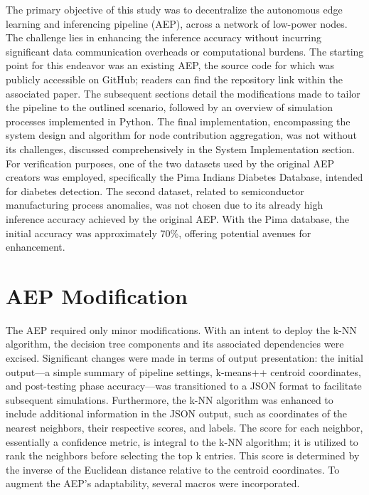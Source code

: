 \label{cha:distributed_aep}
The primary objective of this study was to decentralize the autonomous edge learning and inferencing pipeline (AEP), across a network of low-power nodes. The challenge lies in enhancing the inference accuracy without incurring significant data communication overheads or computational burdens. The starting point for this endeavor was an existing AEP, the source code for which was publicly accessible on GitHub; readers can find the repository link within the associated paper. The subsequent sections detail the modifications made to tailor the pipeline to the outlined scenario, followed by an overview of simulation processes implemented in Python. The final implementation, encompassing the system design and algorithm for node contribution aggregation, was not without its challenges, discussed comprehensively in the System Implementation section. For verification purposes, one of the two datasets used by the original AEP creators was employed, specifically the Pima Indians Diabetes Database\cite{diabetes_db}, intended for diabetes detection. The second dataset, related to semiconductor manufacturing process anomalies, was not chosen due to its already high inference accuracy achieved by the original AEP. With the Pima database, the initial accuracy was approximately 70\%, offering potential avenues for enhancement.


\section{AEP Modification}
\label{sec:aep_modification}

The AEP required only minor modifications. With an intent to deploy the k-NN algorithm, the decision tree components and its associated dependencies were excised. Significant changes were made in terms of output presentation: the initial output—a simple summary of pipeline settings, k-means++ centroid coordinates, and post-testing phase accuracy—was transitioned to a JSON format to facilitate subsequent simulations. Furthermore, the k-NN algorithm was enhanced to include additional information in the JSON output, such as coordinates of the nearest neighbors, their respective scores, and labels. The score for each neighbor, essentially a confidence metric, is integral to the k-NN algorithm; it is utilized to rank the neighbors before selecting the top k entries. This score is determined by the inverse of the Euclidean distance relative to the centroid coordinates. To augment the AEP's adaptability, several macros were incorporated.

